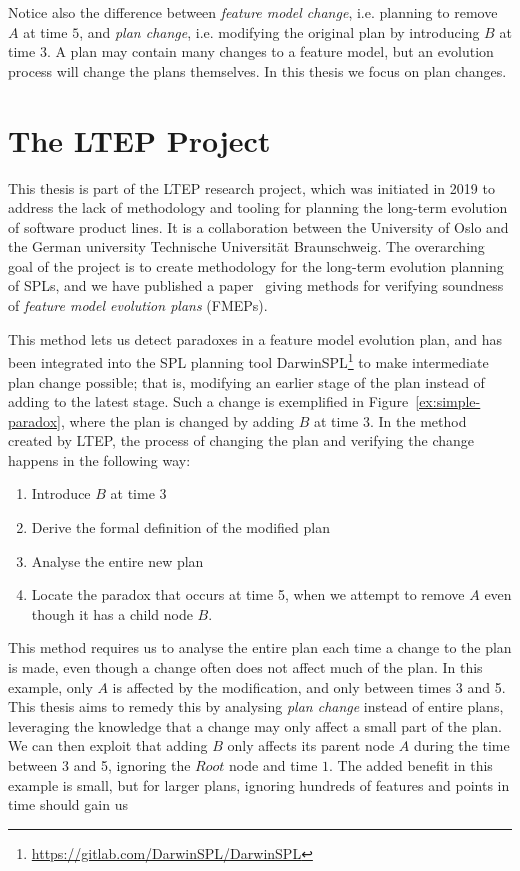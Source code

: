 Notice also the difference between \emph{feature model change}, i.e. planning to remove $A$ at time $5$, and \emph{plan change}, i.e. modifying the original plan by introducing $B$ at time 3. A plan may contain many changes to a feature model, but an evolution process will change the plans themselves. In this thesis we focus on plan changes.

\section{The LTEP Project}
\label{sec:the-ltep-project}
This thesis is part of the LTEP research project, which was initiated in 2019 to address the lack of methodology and tooling for planning the long-term evolution of software product lines. It is a collaboration between the University of Oslo and the German university Technische Universität Braunschweig. The overarching goal of the project is to create methodology for the long-term evolution planning of SPLs, and we have published a paper~\cite{art:consistency-preserving-evolution-planning} giving methods for verifying soundness of \emph{feature model evolution plans} (FMEPs). 

This method lets us detect paradoxes in a feature model evolution plan, and has been integrated into the SPL planning tool DarwinSPL\footnote{\url{https://gitlab.com/DarwinSPL/DarwinSPL}} to make intermediate plan change possible; that is, modifying an earlier stage of the plan instead of adding to the latest stage. Such a change is exemplified in Figure~\vref{ex:simple-paradox}, where the plan is changed by adding $B$ at time $3$. In the method created by LTEP, the process of changing the plan and verifying the change happens in the following way:
\begin{enumerate}[1)]
   \item Introduce $B$ at time $3$
   \item Derive the formal definition of the modified plan
   \item Analyse the entire new plan
   \item Locate the paradox that occurs at time 5, when we attempt to remove $A$ even though it has a child node $B$.
\end{enumerate}
This method requires us to analyse the entire plan each time a change to the plan is made, even though a change often does not affect much of the plan. In this example, only $A$ is affected by the modification, and only between times 3 and 5. This thesis aims to remedy this by analysing \emph{plan change} instead of entire plans, leveraging the knowledge that a change may only affect a small part of the plan. We can then exploit that adding $B$ only affects its parent node $A$ during the time between 3 and 5, ignoring the $Root$ node and time $1$. The added benefit in this example is small, but for larger plans, ignoring hundreds of features and points in time should gain us 

